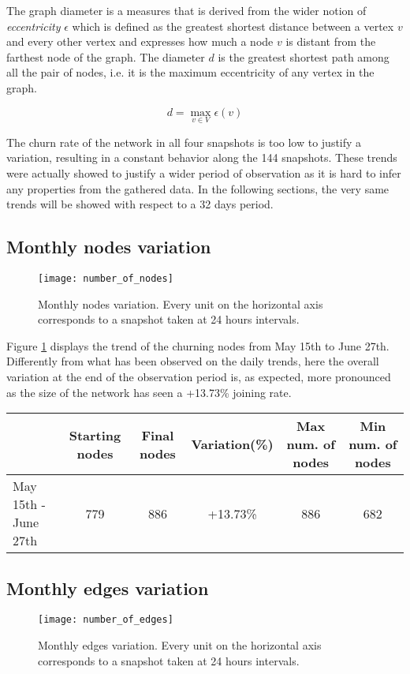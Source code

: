 	The graph diameter is a measures that is derived from the wider notion of \textit{eccentricity} $\epsilon$ which is defined as the greatest shortest distance between a vertex \(v\) and every other vertex and expresses how much a node \(v\) is distant from the farthest node of the graph. The diameter \(d\) is the greatest shortest path among all the pair of nodes, i.e. it is the maximum eccentricity of any vertex in the graph.
	
	\[d = \max_{v \in V} \epsilon(v)\]
	
	The churn rate of the network in all four snapshots is too low to justify a variation, resulting in a constant behavior along the 144 snapshots. These trends were actually showed to justify a wider period of observation as it is hard to infer any properties from the gathered data. In the following sections, the very same trends will be showed with respect to a 32 days period. 

	\subsection{Monthly nodes variation}
	
	\begin{figure}
		\centering
		\texttt{[image: number\_of\_nodes]}
		\caption{Monthly nodes variation. Every unit on the horizontal axis corresponds to a snapshot taken at 24 hours intervals.}
		\label{monthly_nodes}
	\end{figure}
	
	Figure \ref{monthly_nodes} displays the trend of the churning nodes from May 15th to June 27th. Differently from what has been observed on the daily trends, here the overall variation at the end of the observation period is, as expected, more pronounced as the size of the network has seen a +13.73\% joining rate.
	
	\begin{center}
		\begin{tabulary}{\linewidth}{| L | C | C | C | C | C |}
			\hline	
			& Starting nodes & Final nodes  & Variation(\%) & Max num. of nodes & Min num. of nodes \\ \hline
			May 15th - June 27th & 779 & 886 & +13.73\% & 886 & 682 \\ \hline
		\end{tabulary}
	\end{center}
	
	\subsection{Monthly edges variation}
	\begin{figure}
		\centering
		\texttt{[image: number\_of\_edges]}
		\caption{Monthly edges variation. Every unit on the horizontal axis corresponds to a snapshot taken at 24 hours intervals.}
		\label{monthly_edges}
	\end{figure}

